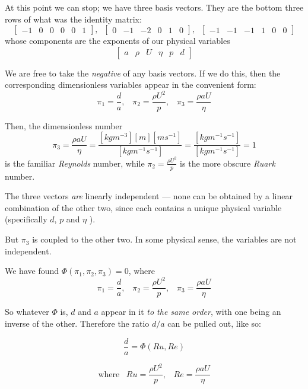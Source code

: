 \documentclass[]{article}
\begin{document}
At this point we can stop; we have three basis vectors.  
They are the bottom three rows of what was the identity matrix:
\[
\begin{bmatrix}
-1 & 0 & 0 & 0 & 0 & 1
\end{bmatrix}
,\;\;
\begin{bmatrix}
0 & -1 & -2 & 0 & 1 & 0
\end{bmatrix}
,\;\;
\begin{bmatrix}
-1 & -1 & -1 & 1 & 0 & 0
\end{bmatrix}
\]
whose components are the exponents of our physical variables
\[
\begin{bmatrix}
a & \rho & U & \eta & p & d
\end{bmatrix}
\]


We are free to take the \emph{negative} of any basis vectors.  If we do this, then the corresponding dimensionless variables appear in the convenient form:
\[ \pi_1 = \frac{d}{a},\;\;\; \pi_2 = \frac{\rho U^2}{p},\;\;\;
 \pi_3 = \frac{\rho a U}{\eta} \]

Then, the dimensionless number
\[ \pi_3 = \frac{\rho a U}{\eta} = \frac{[kg m^{-3}] [m] [m s^{-1}]}{[kg m^{-1} s^{-1}]} = \frac{[kg m^{-1} s^{-1}]}{[kg m^{-1} s^{-1}]} = 1\]
is the familiar \emph{Reynolds} number, while $\pi_2 = \frac{\rho U^2}{p}$ is the more obscure \emph{Ruark} number.

\vspace{2em}
The three vectors \emph{are} linearly independent --- none can be obtained by a linear combination of the other two, since each contains a unique physical variable (specifically $d$, $p$ and $\eta$ ).

But $\pi_3$ is coupled to the other two.  In some physical sense, the variables are not independent.

\vspace{2em}
We have found $\Phi(\pi_1, \pi_2, \pi_3)=0$, where
\[ \pi_1 = \frac{d}{a},\;\;\; \pi_2 = \frac{\rho U^2}{p},\;\;\;
 \pi_3 = \frac{\rho a U}{\eta} \]

So whatever $\Phi$ is, $d$ and $a$ appear in it \emph{to the same order}, with one being an inverse of the other.  Therefore the ratio $d/a$ can be pulled out, like so:

\[ \frac{d}{a} = \Phi(Ru, Re ) \]

\[ \text{where}\;\;\;  Ru = \frac{\rho U^2}{p},\;\;\;
 Re = \frac{\rho a U}{\eta} \]


\vspace*{2em}
\end{document}
